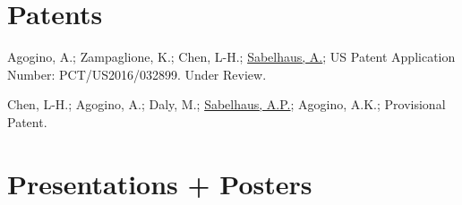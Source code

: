 \documentclass[letterpaper]{deedy-resume} %
\begin{document}

\section{Patents}

\vspace{0.2cm}

\begin{etaremune}

\item {} Agogino, A.; Zampaglione, K.; Chen, L-H.; \underline{Sabelhaus, A.}; US Patent Application Number: PCT/US2016/032899. Under Review.

\item {} Chen, L-H.; Agogino, A.; Daly, M.; \underline{Sabelhaus, A.P.}; Agogino, A.K.; Provisional Patent.

\end{etaremune}



\section{Presentations + Posters}
\end{document}
